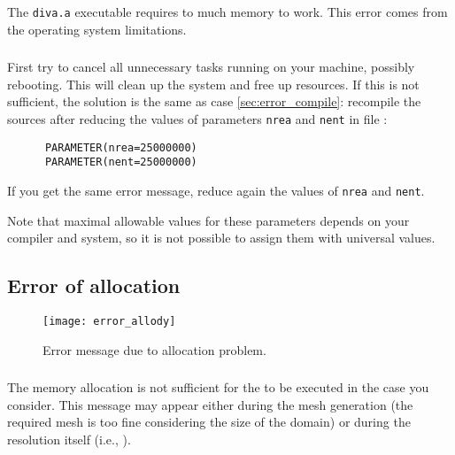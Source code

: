 \subsubsection{\question}

The \texttt{diva.a} executable requires to much memory to work. This error comes from the operating system limitations.

\subsubsection{\answer}
First try to cancel all unnecessary tasks running on your machine, possibly rebooting. This will clean up the system and free up resources. If this is not sufficient, the solution is the same as case \ref{sec:error_compile}: recompile the sources after reducing the values of parameters \texttt{nrea} and \texttt{nent} in file :
\begin{verbatim}
      PARAMETER(nrea=25000000)
      PARAMETER(nent=25000000)
\end{verbatim}
If you get the same error message, reduce again the values of \texttt{nrea} and \texttt{nent}.

Note that maximal allowable values for these parameters depends on your compiler and system, so it is not possible to assign them with universal values.

\subsection{Error of allocation \label{sec:error_allocation}}

\begin{figure}[htpb]
\centering
\texttt{[image: error\_allody]}
\caption{Error message due to allocation problem.\label{fig:error_allocation}}
\end{figure}

\subsubsection{\question}

The memory allocation is not sufficient for the \diva to be executed in the case you consider. This message may appear either during the mesh generation (the required mesh is too fine considering the size of the domain) or during the resolution itself (i.e., ).

